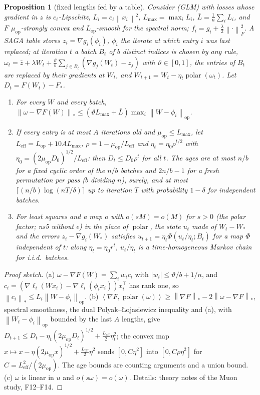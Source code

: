 \documentclass[10pt]{article}
\newtheorem{proposition}[theorem]{Proposition}
\theoremstyle{remark}
\newcommand{\norm}[1]{\left\|#1\right\|}
\newcommand{\nop}[1]{\left\|#1\right\|_{\mathrm{op}}}
\newcommand{\nnuc}[1]{\left\|#1\right\|_{*}}
\newcommand{\nF}[1]{\left\|#1\right\|_{F}}
\newcommand{\inner}[2]{\left\langle #1, #2 \right\rangle}
\newcommand{\abs}[1]{\left|#1\right|}
\newcommand{\polar}{\operatorname{polar}}
\newcommand{\Lop}{L_{\mathrm{op}}}
\newcommand{\muop}{\mu_{\mathrm{op}}}
\newcommand{\LEff}{L_{\mathrm{eff}}}
\begin{document}
\begin{proposition}[fixed lengths fed by a table]\label{prop:schedule}
Consider (GLM) with losses whose gradient in $z$ is $c_\ell$-Lipschitz, $L_i=c_\ell\norm{x_i}^2$, $L_{\max}=\max_iL_i$,
$\bar L=\frac1n\sum_iL_i$, and $F$ $\muop$-strongly convex and $\Lop$-smooth for the spectral norm; $f_i=g_i+\frac\lambda2\nF\cdot^2$.
A SAGA table stores $z_i=\nabla g_i(\phi_i)$, $\phi_i$ the iterate at which entry $i$ was last replaced; at iteration $t$ a
batch $B_t$ of $b$ distinct indices is chosen by any rule, $\omega_t=\bar z+\lambda W_t+\frac\vartheta b\sum_{j\in
B_t}(\nabla g_j(W_t)-z_j)$ with $\vartheta\in[0,1]$, the entries of $B_t$ are replaced by their gradients at $W_t$, and
$W_{t+1}=W_t-\eta_t\polar(\omega_t)$. Let $D_t=F(W_t)-F_\ast$.
\begin{enumerate}[label=(\alph*),itemsep=0pt,topsep=2pt]
\item For every $W$ and every batch, $\nnuc{\omega-\nabla F(W)}\le(\vartheta L_{\max}+\bar L)\max_i\nop{W-\phi_i}$.
\item If every entry is at most $A$ iterations old and $\muop\le L_{\max}$, let $\LEff=\Lop+10AL_{\max}$,
$\rho=1-\muop/\LEff$ and $\eta_t=\eta_0\rho^{t/2}$ with $\eta_0=(2\muop D_0)^{1/2}/\LEff$: then $D_t\le D_0\rho^t$ for all
$t$. The ages are at most $n/b$ for a fixed cyclic order of the $n/b$ batches and $2n/b-1$ for a fresh permutation per
pass ($b$ dividing $n$), surely, and at most $\lceil(n/b)\log(nT/\delta)\rceil$ up to iteration $T$ with probability
$1-\delta$ for independent batches.
\item For least squares and a map $o$ with $o(sM)=o(M)$ for $s>0$ (the polar factor; ns5 without $\epsilon$) in the
place of $\polar$, the state $u_t$ made of $W_t-W_\ast$ and the errors $z_i-\nabla g_i(W_\ast)$ satisfies
$u_{t+1}=\eta_t\Phi(u_t/\eta_t;B_t)$ for a map $\Phi$ independent of $t$: along $\eta_t=\eta_0r^t$, $u_t/\eta_t$ is a
time-homogeneous Markov chain for i.i.d.\ batches.
\end{enumerate}
\end{proposition}
\begin{proof}[Proof sketch]
(a) $\omega-\nabla F(W)=\sum_iw_ic_i$ with $\abs{w_i}\le\vartheta/b+1/n$, and
$c_i=(\nabla\ell_i(Wx_i)-\nabla\ell_i(\phi_ix_i))x_i^\top$ has rank one, so $\nnuc{c_i}\le L_i\nop{W-\phi_i}$. (b)
$\inner{\nabla F}{\polar(\omega)}\ge\nnuc{\nabla F}-2\nnuc{\omega-\nabla F}$, spectral smoothness, the dual
Polyak--\L{}ojasiewicz inequality and (a), with $\nop{W_t-\phi_i}$ bounded by the last $A$ lengths, give
$D_{t+1}\le D_t-\eta_t(2\muop D_t)^{1/2}+\frac{\LEff}2\eta_t^2$; the convex map $x\mapsto x-\eta(2\muop x)^{1/2}+\frac{\LEff}2\eta^2$
sends $[0,C\eta^2]$ into $[0,C\rho\eta^2]$ for $C=\LEff^2/(2\muop)$. The age bounds are counting arguments and a union
bound. (c) $\omega$ is linear in $u$ and $o(s\omega)=o(\omega)$. Details: theory notes of the Muon study, F12--F14.
\end{proof}
\end{document}
